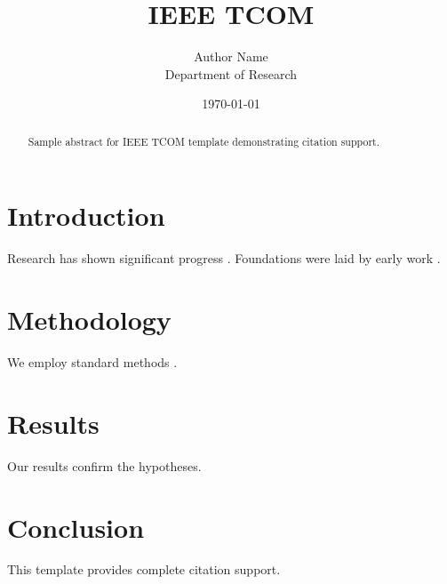 ﻿\documentclass{IEEEtran}
\title{IEEE TCOM}
\author{Author Name \\ \small Department of Research}
\date{\today}
\begin{document}
\maketitle

\begin{abstract}
Sample abstract for IEEE TCOM template demonstrating citation support.
\end{abstract}

\section{Introduction}
Research has shown significant progress \citep{einstein1905}. Foundations were laid by early work \citep{turing1950}.

\section{Methodology}
We employ standard methods \citep{knuth1984}.

\section{Results}
Our results confirm the hypotheses.

\section{Conclusion}
This template provides complete citation support.



\end{document}
